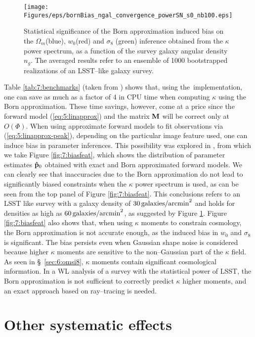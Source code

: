 %
\begin{figure}
\begin{center}
\texttt{[image: Figures/eps/bornBias\_ngal\_convergence\_powerSN\_s0\_nb100.eps]}
\end{center}
\caption{Statistical significance of the Born approximation induced bias on the $\Omega_m$(blue), $w_0$(red) and  $\sigma_8$ (green) inference obtained from the $\kappa$ power spectrum, as a function of the survey galaxy angular density $n_g$. The averaged results refer to an ensemble of 1000 bootstrapped realizations of an LSST--like galaxy survey.}
\label{fig:7:biasbornngal}
\end{figure}
%
Table \ref{tab:7:benchmarks} (taken from \citep{PetriBorn}) shows that, using the \LT\,implementation, one can save as much as a factor of 4 in CPU time when computing $\kappa$ using the Born approximation. These time savings, however, come at a price since the forward model (\ref{eq:5:linapprox}) and the matrix $\mathbf{M}$ will be correct only at $O(\Phi)$. When using approximate forward models to fit observations via (\ref{eq:5:linapprox-peak}), depending on the particular image feature used, one can induce bias in parameter inferences. This possibility was explored in \citep{PetriBorn}, from which we take Figure \ref{fig:7:biasfeat}, which shows the distribution of parameter estimates $\mathbf{\hat{p}}_0$ obtained with exact and Born approximated forward models. We can clearly see that inaccuracies due to the Born approximation do not lead to significantly biased constraints when the $\kappa$ power spectrum is used, as can be seen from the top panel of Figure \ref{fig:7:biasfeat}. This conclusions refers to an LSST like survey with a galaxy density of $30\,{\rm galaxies/arcmin}^2$ and holds for densities as high as $60\,{\rm galaxies/arcmin}^2$, as suggested by Figure \ref{fig:7:biasbornngal}. Figure \ref{fig:7:biasfeat} also shows that, when using $\kappa$ moments to constrain cosmology, the Born approximation is not accurate enough, as the induced bias in $w_0$ and $\sigma_8$ is significant. The bias persists even when Gaussian shape noise is considered because higher $\kappa$ moments are sensitive to the non--Gaussian part of the $\kappa$ field. As seen in \S~\ref{sec:6:omsi8}, $\kappa$ moments contain significant cosmological information. In a WL analysis of a survey with the statistical power of LSST, the Born approximation is not sufficient to correctly predict $\kappa$ higher moments, and an exact approach based on ray--tracing is needed. 

\section{Other systematic effects}

